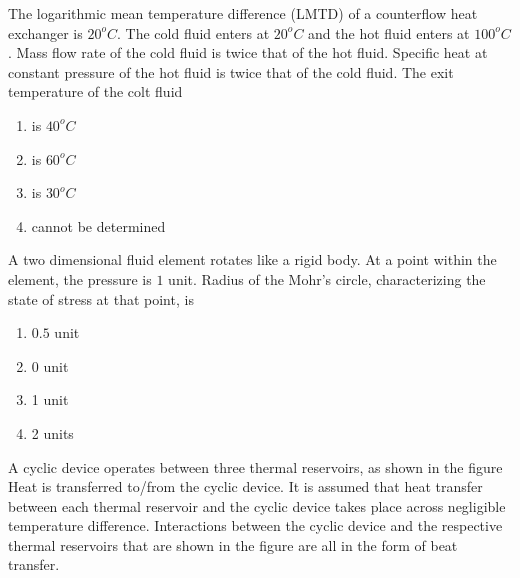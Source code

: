     \item The logarithmic mean temperature difference (LMTD) of a counterflow heat exchanger is $20^o C$. The cold fluid enters at $20^o C$ and the hot fluid enters at $100^o C$. Mass flow rate of the cold fluid is twice that of the hot fluid. Specific heat at constant pressure of the hot fluid is twice that of the cold fluid. The exit temperature of the colt fluid
    \begin{multicols}{2}
    \begin{enumerate}
        \item is $40^o C$
        \item is $60^o C$
        \item is $30^o C$
        \item cannot be determined
    \end{enumerate}
    \end{multicols}
    
    \item A two dimensional fluid element rotates like a rigid body. At a point within the element, the pressure is $1$ unit. Radius of the Mohr's circle, characterizing the state of stress at that point, is
    \begin{multicols}{4}
    \begin{enumerate}
        \item $0.5$ unit
        \item 0 unit
        \item 1 unit
        \item 2 units
    \end{enumerate}
    \end{multicols}
    \item A cyclic device operates between three thermal reservoirs, as shown in the figure Heat is transferred to/from the cyclic device. It is assumed that heat transfer between each thermal reservoir and the cyclic device takes place across negligible temperature difference. Interactions between the cyclic device and the respective thermal reservoirs that are shown in the figure are all in the form of beat transfer.

    \begin{figure}[!ht]
\centering
{}%

\label{fig:my_label}
\end{figure}
    
